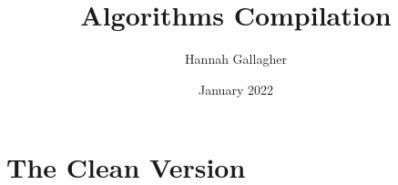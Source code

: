 \documentclass{article}
\title{Algorithms Compilation}
\author{Hannah Gallagher}
\date{January 2022}
\begin{document}
\maketitle

\section{The Clean Version}
\end{document}
